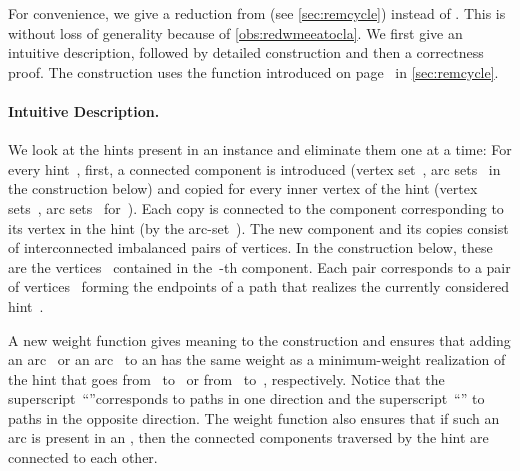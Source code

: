 For convenience, we give a reduction from \pWMEECLAs{} (see \autoref{sec:remcycle}) instead of \pWMEEAs{}. This is without loss of generality because of \autoref{obs:redwmeeatocla}. We first give an intuitive description, followed by detailed construction and then a correctness proof. The construction uses the  function introduced on page~\pageref{def:minpath} in \autoref{sec:remcycle}.

\paragraph{Intuitive Description.} We look at the hints present in an \pWMEECLAs{} instance and eliminate them one at a time: For every hint~, first, a connected component is introduced (vertex set~, arc sets~ in the construction below) and copied for every inner vertex of the hint (vertex sets~, arc sets~ for~). Each copy is connected to the component corresponding to its vertex in the hint (by the arc-set~). The new component and its copies consist of interconnected imbalanced pairs of vertices. In the construction below, these are the vertices~ contained in the~-th component. Each pair corresponds to a pair of vertices~ forming the endpoints of a path that realizes the currently considered hint~.

 A new weight function gives meaning to the construction and ensures that adding an arc~ or an arc~ to an \EE{} has the same weight as a minimum-weight realization of the hint that goes from~ to~ or from~ to~, respectively. Notice that the superscript~``''corresponds to paths in one direction and the superscript~``'' to paths in the opposite direction. The weight function also ensures that if such an arc is present in an \EE{}, then the connected components traversed by the hint are connected to each other.

